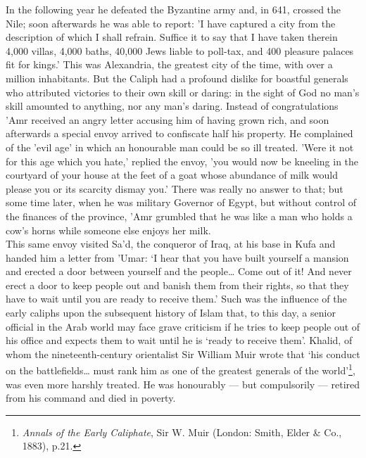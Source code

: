 \documentclass[10pt, twoside,openright]{book}
\begin{document}
In the following year he defeated the Byzantine army and, in 641, crossed the Nile; soon afterwards he was able to report: 'I have captured a city from the description of which I shall refrain. Suffice it to say that I have taken therein 4,000 villas, 4,000 baths, 40,000 Jews liable to poll\hyp{}tax, and 400 pleasure palaces fit for kings.' This was Alexandria, the greatest city of the time, with over a million inhabitants. But the Caliph had a profound dislike for boastful generals who attributed victories to their own skill or daring: in the sight of God no man's skill amounted to anything, nor any man's daring. Instead of congratulations 'Amr received an angry letter accusing him of having grown rich, and soon afterwards a special envoy arrived to confiscate half his property. He complained of the 'evil age' in which an honourable man could be so ill treated. 'Were it not for this age which you hate,' replied the envoy, 'you would now be kneeling in the courtyard of your house at the feet of a goat whose abundance of milk would please you or its scarcity dismay you.' There was really no answer to that; but some time later, when he was military Governor of Egypt, but without control of the finances of the province, 'Amr grumbled that he was like a man who holds a cow's horns while someone else enjoys her milk. \\

This same envoy visited Sa'd, the conqueror of Iraq, at his base in Kufa and handed him a letter from 'Umar: `I hear that you have built yourself a mansion and erected a door between yourself and the people\ldots{} Come out of it! And never erect a door to keep people out and banish them from their rights, so that they have to wait until you are ready to receive them.' Such was the influence of the early caliphs upon the subsequent history of Islam that, to this day, a senior official in the Arab world may face grave criticism if he tries to keep people out of his office and expects them to wait until he is `ready to receive them'. Khalid, of whom the nineteenth\hyp{}century orientalist Sir William Muir wrote that `his conduct on the battlefields\ldots{} must rank him as one of the greatest generals of the world'\footnote{\emph{Annals of the Early Caliphate}, Sir W. Muir (London: Smith, Elder \& Co., 1883), p.21.}, was even more harshly treated. He was honourably --- but compulsorily --- retired from his command and died in poverty. \\
\end{document}
